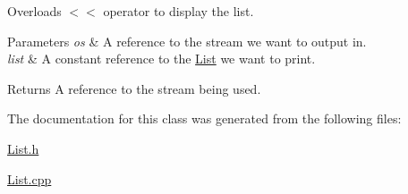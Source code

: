 Overloads $<$$<$ operator to display the list. 


\begin{DoxyParams}{Parameters}
{\em os} & A reference to the stream we want to output in.\\
\hline
{\em list} & A constant reference to the \hyperlink{class_c_s170_1_1_list_lab_1_1_list}{List} we want to print.\\
\hline
\end{DoxyParams}
\begin{DoxyReturn}{Returns}
A reference to the stream being used. 
\end{DoxyReturn}


The documentation for this class was generated from the following files\-:\begin{DoxyCompactItemize}
\item 
\hyperlink{_list_8h}{List.\-h}\item 
\hyperlink{_list_8cpp}{List.\-cpp}\end{DoxyCompactItemize}
